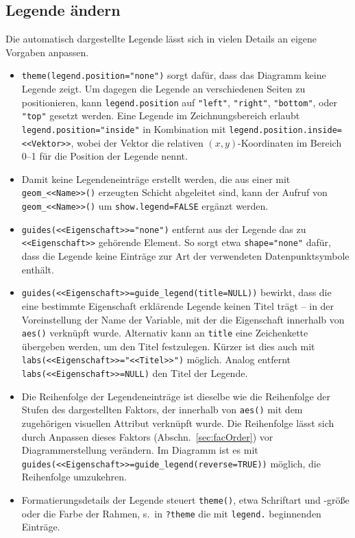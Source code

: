 \subsection{Legende ändern}
\label{sec:ggplotLegend}

Die automatisch dargestellte Legende lässt sich in vielen Details an eigene Vorgaben anpassen.

\begin{itemize}
\item \lstinline!theme(legend.position="none")! sorgt dafür, dass das Diagramm keine Legende zeigt. Um dagegen die Legende an verschiedenen Seiten zu positionieren, kann \lstinline!legend.position! auf \lstinline!"left"!, \lstinline!"right"!, \lstinline!"bottom"!, oder \lstinline!"top"! gesetzt werden. Eine Legende im Zeichnungsbereich erlaubt \lstinline!legend.position="inside"! in Kombination mit \lstinline!legend.position.inside=<<Vektor>>!, wobei der Vektor die relativen $(x,y)$-Koordinaten im Bereich 0--1 für die Position der Legende nennt.
\item Damit keine Legendeneinträge erstellt werden, die aus einer mit \lstinline!geom_<<Name>>()! erzeugten Schicht abgeleitet sind, kann der Aufruf von \lstinline!geom_<<Name>>()! um \lstinline!show.legend=FALSE! ergänzt werden.
\item {} \lstinline!guides(<<Eigenschaft>>="none")! entfernt aus der Legende das zu \lstinline!<<Eigenschaft>>! gehörende Element. So sorgt etwa \lstinline!shape="none"! dafür, dass die Legende keine Einträge zur Art der verwendeten Datenpunktsymbole enthält.
\item \lstinline!guides(<<Eigenschaft>>=guide_legend(title=NULL))! bewirkt, dass die eine bestimmte Eigenschaft erklärende Legende keinen Titel trägt -- in der Voreinstellung der Name der Variable, mit der die Eigenschaft innerhalb von \lstinline!aes()! verknüpft wurde. Alternativ kann an \lstinline!title! eine Zeichenkette übergeben werden, um den Titel festzulegen. Kürzer ist dies auch mit \lstinline!labs(<<Eigenschaft>>="<<Titel>>")! möglich. Analog entfernt \lstinline!labs(<<Eigenschaft>>=NULL)! den Titel der Legende.
\item Die Reihenfolge der Legendeneinträge ist dieselbe wie die Reihenfolge der Stufen des dargestellten Faktors, der innerhalb von \lstinline!aes()! mit dem zugehörigen visuellen Attribut verknüpft wurde. Die Reihenfolge lässt sich durch Anpassen dieses Faktors (Abschn.\ \ref{sec:facOrder}) vor Diagrammerstellung verändern. Im Diagramm ist es mit \lstinline!guides(<<Eigenschaft>>=guide_legend(reverse=TRUE))! möglich, die Reihenfolge umzukehren.
\item Formatierungsdetails der Legende steuert \lstinline!theme()!, etwa Schriftart und -größe oder die Farbe der Rahmen, s.\ in \lstinline!?theme! die mit \lstinline!legend.! beginnenden Einträge.
\end{itemize}

